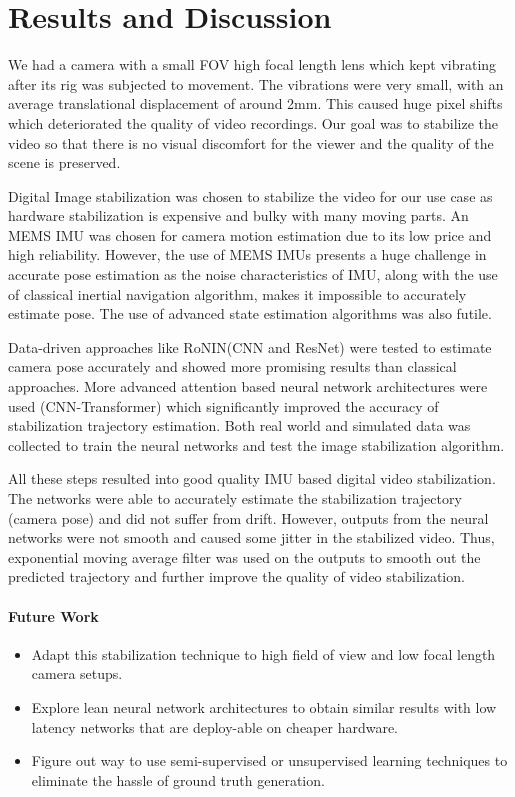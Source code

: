 \chapter{Results and Discussion} \label{chapter_five}

We had a camera with a small FOV high focal length lens which kept vibrating after its rig was subjected to movement. The vibrations were very small, with an average translational displacement of around 2mm. This caused huge pixel shifts which deteriorated the quality of video recordings. Our goal was to stabilize the video so that there is no visual discomfort for the viewer and the quality of the scene is preserved.
    
Digital Image stabilization was chosen to stabilize the video for our use case as hardware stabilization is expensive and bulky with many moving parts. An MEMS IMU was chosen for camera motion estimation due to its low price and high reliability. However, the use of MEMS IMUs presents a huge challenge in accurate pose estimation as the noise characteristics of IMU, along with the use of classical inertial navigation algorithm, makes it impossible to accurately estimate pose. The use of advanced state estimation algorithms was also futile.

Data-driven approaches like RoNIN(CNN and ResNet) were tested to estimate camera pose accurately and showed more promising results than classical approaches. More advanced attention based neural network architectures were used (CNN-Transformer) which significantly improved the accuracy of stabilization trajectory estimation. Both real world and simulated data was collected to train the neural networks and test the image stabilization algorithm.

All these steps resulted into good quality IMU based digital video stabilization. The networks were able to accurately estimate the stabilization trajectory (camera pose) and did not suffer from drift. However, outputs from the neural networks were not smooth and caused some jitter in the stabilized video. Thus, exponential moving average filter was used on the outputs to smooth out the predicted trajectory and further improve the quality of video stabilization.

\subsubsection{Future Work}
\begin{itemize}
    \item Adapt this stabilization technique to high field of view and low focal length camera setups.

    \item Explore lean neural network architectures to obtain similar results with low latency networks that are deploy-able on cheaper hardware.

    \item Figure out way to use semi-supervised or unsupervised learning techniques to eliminate the hassle of ground truth generation.
    
\end{itemize}
